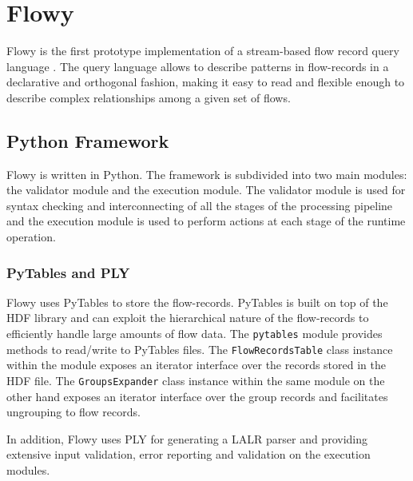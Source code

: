 \chapter{Flowy}\label{ch:flowy-design}

Flowy \cite{kkanev:thesis:2009}\cite{kkanev:2010} is the first prototype implementation of a stream-based flow record query language \cite{vmarinov:thesis:2009}\cite{vmarinov:2009}\cite{vmarinov:2008}. The query language allows to describe patterns in flow-records in a declarative and orthogonal fashion, making it easy to read and flexible enough to describe complex relationships among a given set of flows. 

\section{Python Framework}\label{sec:python-framework}
Flowy is written in Python. The framework is subdivided into two main modules: the validator module and the execution module. The validator module is used for syntax checking and interconnecting of all the stages of the processing pipeline and the execution module is used to perform actions at each stage of the runtime operation. 

\subsection{PyTables and PLY}\label{subsec:pytable-ply}
Flowy uses PyTables \cite{falted:2003} to store the flow-records. PyTables is built on top of the \ac{HDF} library and can exploit the hierarchical nature of the flow-records to efficiently handle large amounts of flow data. The \texttt{pytables} module provides methods to read/write to PyTables files. The \texttt{FlowRecordsTable} class instance within the module exposes an iterator interface over the records stored in the HDF file. The \texttt{GroupsExpander} class instance within the same module on the other hand exposes an iterator interface over the group records and facilitates ungrouping to flow records.

In addition, Flowy uses \ac{PLY} for generating a \ac{LALR} parser and providing extensive input validation, error reporting and validation on the execution modules. 

